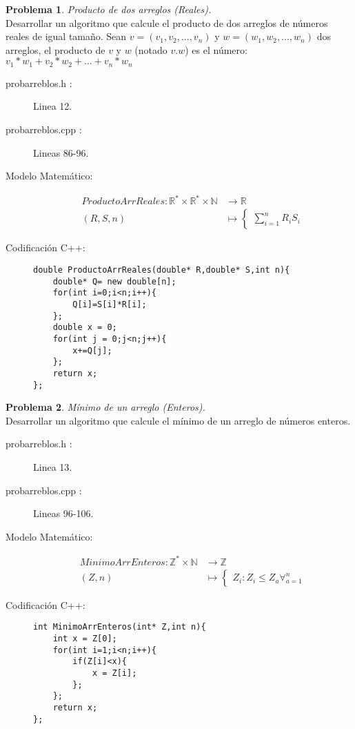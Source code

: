 \documentclass{article}
\theoremstyle{plain}
\theoremstyle{definition}
\newtheorem{problem}{Problema}
\begin{document}
\begin{problem} \emph{Producto de dos arreglos (Reales).}\\
\hspace*{7mm}Desarrollar un algoritmo que calcule el producto de dos arreglos de números reales de igual tamaño. Sean $v=(v_1,v_2,..., v_n)$ y $w=(w_1,w_2,..., w_n)$ dos arreglos, el producto de $v$ y $w$ (notado $v.w$) es el número: $v_1 * w_1 + v_2*w_2 +...+ v_n * w_n$
\begin{description}
\item[probarreblos.h :] Linea 12. \item[probarreblos.cpp :] Lineas 86-96.

\item[Modelo Matemático:]
\begin{align*}
ProductoArrReales: \mathbb{R}^{*}\times\mathbb{R}^{*}\times\mathbb{N} &\to \mathbb{R}\\
(R,S,n) &\mapsto
\begin{cases}
\sum_{i=1}^n R_iS_i
\end{cases}
\end{align*}
%
\item[Codificación \textsf{C++}:]\hfill
%
\begin{verbatim}
double ProductoArrReales(double* R,double* S,int n){
    double* Q= new double[n];
    for(int i=0;i<n;i++){
        Q[i]=S[i]*R[i];
    };
    double x = 0;
    for(int j = 0;j<n;j++){
        x+=Q[j];
    };
    return x;
};
\end{verbatim}
\end{description}
\end{problem}

\begin{problem} \emph{Mínimo de un arreglo (Enteros).}\\
\hspace*{7mm}Desarrollar un algoritmo que calcule el mínimo de un arreglo de números enteros.
\begin{description}
\item[probarreblos.h :] Linea 13. \item[probarreblos.cpp :] Lineas 96-106.

\item[Modelo Matemático:]
\begin{align*}
MinimoArrEnteros: \mathbb{Z}^{*}\times\mathbb{N} &\to \mathbb{Z}\\
(Z,n) &\mapsto
\begin{cases}
Z_i: Z_i \leq Z_a \forall_{a=1}^n 
\end{cases}
\end{align*}
%
\item[Codificación \textsf{C++}:]\hfill
%
\begin{verbatim}
int MinimoArrEnteros(int* Z,int n){
    int x = Z[0];
    for(int i=1;i<n;i++){
        if(Z[i]<x){
            x = Z[i];
        };
    };
    return x;
};
\end{verbatim}
\end{description}
\end{problem}
\end{document}
